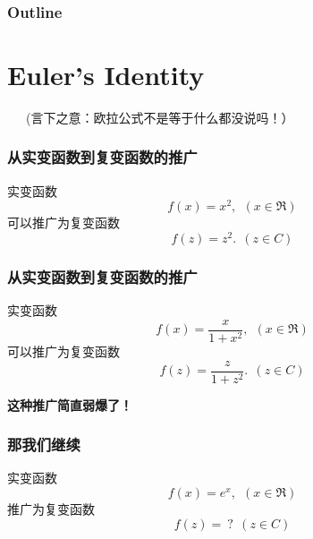 \documentclass[CJK,13pt]{beamer}
\date{}
\begin{document}
  \bch
{}

\begin{frame}
\frametitle{Outline}
\tableofcontents
\end{frame}

\section{Euler's Identity}


\begin{frame}



   \ \ \ (言下之意：欧拉公式不是等于什么都没说吗！）
  
\end{frame}

\begin{frame}
  \frametitle{从实变函数到复变函数的推广}

  \bex
  实变函数
  $$f(x) = x^2, \ \ (x\in \Re)$$
  可以推广为复变函数
  $$f(z) = z^2. \ \ (z\in C) $$
  \eex

  
\end{frame}


\begin{frame}
  \frametitle{从实变函数到复变函数的推广}
  
  

  \bex
  实变函数
  $$f(x) = \frac{x}{1+x^2},\ \ (x\in \Re)$$
  可以推广为复变函数
  $$f(z) = \frac{z}{1+z^2}. \ \ (z\in C)$$
  \eex

  
\end{frame}



\begin{frame}
  

  \bcenter
      {\bf \Large 这种推广简直弱爆了！}

      \ecenter
  
\end{frame}


\begin{frame}
  \frametitle{那我们继续}
  
  实变函数
  $$f(x) = e^x,\ \ (x\in \Re)$$
  推广为复变函数
  $$f(z) = \ ? \ \ (z\in C)$$
  
\end{frame}
\end{document}
